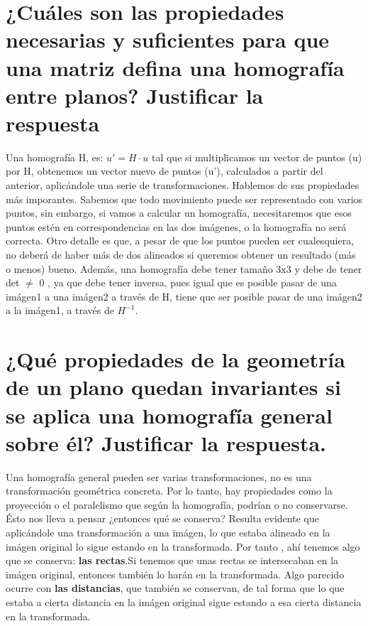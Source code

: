 \section{¿Cuáles son las propiedades necesarias y suficientes para que una matriz
defina una homografía entre planos? Justificar la respuesta}
Una homografía H, es:  $ {u}'=H\cdot u $
\newline    tal que si multiplicamos un vector de puntos (u) por H,
obtenemos un vector nuevo de puntos ({u}'), calculados a partir del anterior, aplicándole una serie
de transformaciones. \newline
Hablemos de sus propiedades más imporantes. Sabemos que todo movimiento puede ser
representado con varios puntos, sin embargo, si vamos a calcular un homografía, necesitaremos que esos puntos
estén en correspondencias en las dos imágenes, o la homografía no será correcta. \newline \newline
Otro detalle es que, a pesar de que los puntos pueden ser cualesquiera, no deberá de haber más de dos alineados si queremos
obtener un resultado (más o menos) bueno. \newline
Además, una homografía debe tener tamaño 3x3 y debe de tener det $\neq$ 0 , ya que debe tener inversa, pues igual que es posible pasar de
una imágen1 a una imágen2 a través de H, tiene que ser posible pasar de una imágen2 a la imágen1, a través de $H^{-1}$.


\section{¿Qué propiedades de la geometría de un plano quedan invariantes si se aplica una homografía general sobre él?
 Justificar la respuesta.}
Una homografía general pueden ser varias transformaciones, no es una transformación geométrica concreta.
Por lo tanto, hay propiedades como la proyección o el paralelismo
que según la homografía, podrían o no conservarse. \newline
Ésto nos lleva a pensar ¿entonces qué se conserva? \newline
Resulta evidente que aplicándole una transformación a una imágen, lo que estaba alineado en la imágen original lo sigue estando
en la transformada. Por tanto , ahí tenemos algo que se conserva: \textbf{las rectas}.\newline Si tenemos que unas rectas se intersecaban
en la imágen original, entonces también lo harán en la transformada. \newline
Algo parecido ocurre con \textbf{las distancias}, que también se conservan, de tal forma que lo que estaba a cierta distancia en la imágen original
sigue estando a esa cierta distancia en la transformada.

